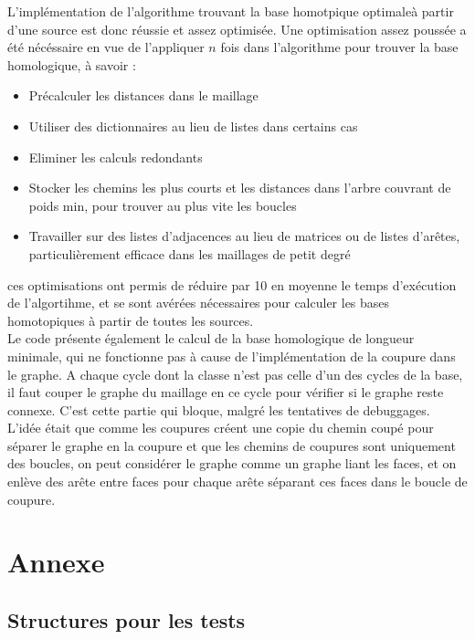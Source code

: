 \documentclass[french]{article}
\begin{document}
L'implémentation de l'algorithme trouvant la base homotpique optimaleà partir d'une source est donc réussie et assez optimisée.
Une optimisation assez poussée a été nécéssaire en vue de l'appliquer $n$ fois dans l'algorithme pour trouver la base homologique, à savoir :
\begin{itemize}
    \item Précalculer les distances dans le maillage
    \item Utiliser des dictionnaires au lieu de listes dans certains cas
    \item Eliminer les calculs redondants
    \item Stocker les chemins les plus courts et les distances dans l'arbre couvrant de poids min, pour trouver au plus vite les boucles
    \item Travailler sur des listes d'adjacences au lieu de matrices ou de listes d'arêtes, particulièrement efficace dans les maillages de petit degré
\end{itemize}
ces optimisations ont permis de réduire par 10 en moyenne le temps d'exécution de l'algortihme, et se sont avérées nécessaires pour calculer les bases homotopiques à partir de toutes les sources. \\

Le code présente également le calcul de la base homologique de longueur minimale, 
qui ne fonctionne pas à cause de l'implémentation de la coupure dans le graphe.
A chaque cycle dont la classe n'est pas celle d'un des cycles de la base, 
il faut couper le graphe du maillage en ce cycle pour vérifier si le graphe reste connexe.
C'est cette partie qui bloque, malgré les tentatives de debuggages. 
L'idée était que comme les coupures créent une copie du chemin coupé pour séparer le graphe en la coupure et que
les chemins de coupures sont uniquement des boucles, 
on peut considérer le graphe comme un graphe liant les faces, et on enlève des arête entre faces pour chaque arête séparant ces faces dans le boucle de coupure.

\printbibliography

\pagebreak

\section{Annexe}

\subsection{Structures pour les tests}
\end{document}
